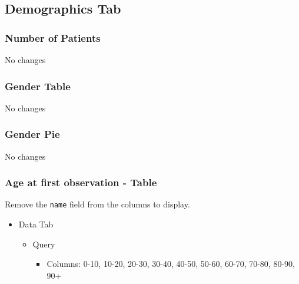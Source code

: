 \documentclass[
]{book}
\providecommand{\tightlist}{%
  \setlength{\itemsep}{0pt}\setlength{\parskip}{0pt}}
\begin{document}
\hypertarget{demographics-tab-1}{%
\subsection*{Demographics Tab}\label{demographics-tab-1}}

\hypertarget{number-of-patients-1}{%
\subsubsection*{Number of Patients}\label{number-of-patients-1}}

No changes

\hypertarget{gender-table-1}{%
\subsubsection*{Gender Table}\label{gender-table-1}}

No changes

\hypertarget{gender-pie-1}{%
\subsubsection*{Gender Pie}\label{gender-pie-1}}

No changes

\hypertarget{age-at-first-observation---table-1}{%
\subsubsection*{Age at first observation - Table}\label{age-at-first-observation---table-1}}

Remove the \texttt{name} field from the columns to display.

\begin{itemize}
\tightlist
\item
  Data Tab

  \begin{itemize}
  \tightlist
  \item
    Query

    \begin{itemize}
    \tightlist
    \item
      Columns: 0-10, 10-20, 20-30, 30-40, 40-50, 50-60, 60-70, 70-80, 80-90, 90+
    \end{itemize}
  \end{itemize}
\end{itemize}
\end{document}
